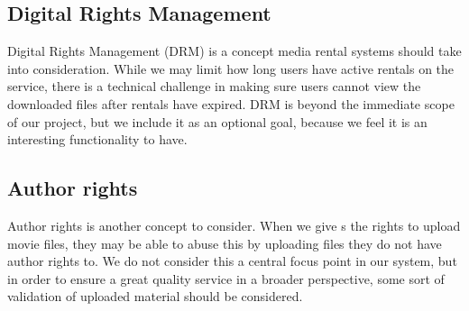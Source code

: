 \subsection{Digital Rights Management}
\label{Overview_assumptions_DRM}
Digital Rights Management (DRM) is a concept media rental systems should take into consideration. While we may limit how long users have active rentals on the service, there is a technical challenge in making sure users cannot view the downloaded files after rentals have expired. DRM is beyond the immediate scope of our project, but we include it as an optional goal, because we feel it is an interesting functionality to have.
\subsection{Author rights}
\label{Overview_assumptions_Author}
Author rights is another concept to consider. When we give s the rights to upload movie files, they may be able to abuse this by uploading files they do not have author rights to. We do not consider this a central focus point in our system, but in order to ensure a great quality service in a broader perspective, some sort of validation of uploaded material should  be considered.